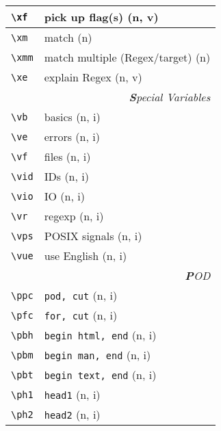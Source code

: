 \documentclass[oneside,10pt,landscape,DIV17]{scrartcl}
\begin{document}
\begin{multicols}{3}
\begin{center}
\begin{tabular}[]{|p{11mm}|p{60mm}|}
\hline     \verb'\xf' &  pick up flag(s)               \hfill (n, v)\\
\hline     \verb'\xm' &  match                         \hfill (n)   \\
\hline     \verb'\xmm'&  match multiple (Regex/target) \hfill (n)   \\
\hline     \verb'\xe' &  explain Regex                 \hfill (n, v)\\
\hline
\hline
\multicolumn{2}{|r|}{\textsl{\textbf{S}pecial Variables}}            \\[1.0ex]
\hline \verb'\vb'   & basics                           \hfill (n, i)\\
\hline \verb'\ve'   & errors                           \hfill (n, i)\\
\hline \verb'\vf'   & files                            \hfill (n, i)\\
\hline \verb'\vid'  & IDs                              \hfill (n, i)\\
\hline \verb'\vio'  & IO                               \hfill (n, i)\\
\hline \verb'\vr'   & regexp                           \hfill (n, i)\\
\hline \verb'\vps'  & POSIX signals                    \hfill (n, i)\\
\hline \verb'\vue'  & use English                      \hfill (n, i)\\
\hline
\hline
\multicolumn{2}{|r|}{\textsl{\textbf{P}OD}}                       \\[1.0ex]
\hline \verb'\ppc'    & \verb'pod, cut'                 \hfill (n, i)\\
\hline \verb'\pfc'    & \verb'for, cut'                 \hfill (n, i)\\
\hline \verb'\pbh'    & \verb'begin html, end'          \hfill (n, i)\\
\hline \verb'\pbm'    & \verb'begin man, end'           \hfill (n, i)\\
\hline \verb'\pbt'    & \verb'begin text, end'          \hfill (n, i)\\
\hline \verb'\ph1'    & \verb'head1'                    \hfill (n, i)\\
\hline \verb'\ph2'    & \verb'head2'                    \hfill (n, i)\\

\end{tabular}
\end{center}
\end{multicols}
\end{document}
